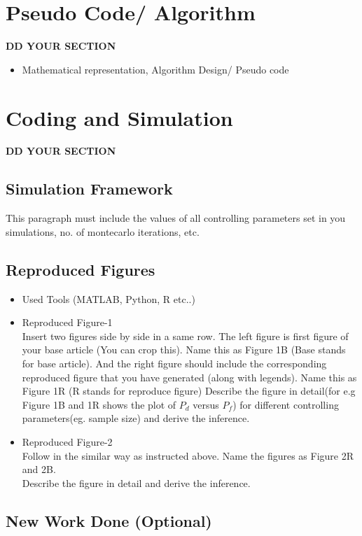 \documentclass{article}
\begin{document}
\section{Pseudo Code/ Algorithm }
\textbf{DD YOUR SECTION}

\begin{itemize}
    \item Mathematical representation, Algorithm Design/ Pseudo code
\end{itemize}
\section{Coding and Simulation}
\textbf{DD YOUR SECTION }
\subsection{Simulation Framework}
\justify This paragraph must include the values of all controlling parameters set in you simulations, no. of montecarlo iterations, etc.
\subsection{Reproduced Figures}
\begin{itemize}
\item Used Tools (MATLAB, Python, R etc..)
\item Reproduced Figure-1\\
Insert two figures side by side in a same row. The left figure is first figure of your base article (You can crop this). Name this as Figure 1B (Base stands for base article). And the right figure should include the corresponding reproduced figure that you have generated (along with legends). Name this as Figure 1R (R stands for reproduce figure)
Describe the figure in detail(for e.g Figure 1B and 1R shows the plot of $P_d$ versus $P_f$) for different controlling parameters(eg. sample size) and derive the inference.

\item Reproduced Figure-2\\
Follow in the similar way as instructed above. Name the figures as Figure 2R and 2B. \\
Describe the figure in detail and derive the inference.
\end{itemize}

\subsection{New Work Done (Optional)}
\end{document}
